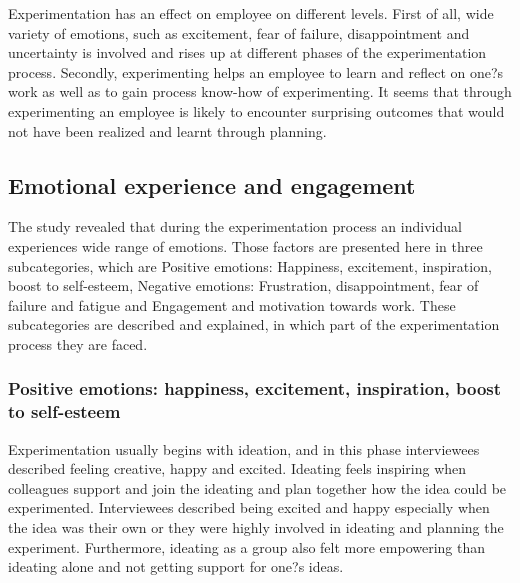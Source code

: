 Experimentation has an effect on employee on different levels. First of all, wide variety of emotions, such as excitement, fear of failure, disappointment and uncertainty is involved and rises up at different phases of the experimentation process. Secondly, experimenting helps an employee to learn and reflect on one?s work as well as to gain process know-how of experimenting. It seems that through experimenting an employee is likely to encounter surprising outcomes that would not have been realized and learnt through planning.  

\subsection{Emotional experience and engagement}
The study revealed that during the experimentation process an individual experiences wide range of emotions. Those factors are presented here in three subcategories, which are Positive emotions: Happiness, excitement, inspiration, boost to self-esteem, Negative emotions: Frustration, disappointment, fear of failure and fatigue and Engagement and motivation towards work. These subcategories are described and explained, in which part of the experimentation process they are faced. 

\subsubsection{Positive emotions: happiness, excitement, inspiration, boost to self-esteem}

Experimentation usually begins with ideation, and in this phase interviewees described feeling creative, happy and excited. Ideating feels inspiring when colleagues support and join the ideating and plan together how the idea could be experimented. Interviewees described being excited and happy especially when the idea was their own or they were highly involved in ideating and planning the experiment.  Furthermore, ideating as a group also felt more empowering than ideating alone and not getting support for one?s ideas. 

